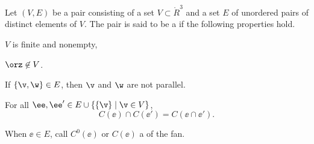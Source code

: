 \begin{definition}  
Let $(V,E)$ be a pair consisting of a set $V\subset \ring{R}^3$ and
a set $E$ of unordered pairs of distinct elements of $V$.  The pair
is said to be a  if the following properties hold.
\begin{description}
\item {} $V$ is finite and  nonempty,
\item {} $\orz\not\in V$.
\item {} If $\{\v,\w\} \in E$, then $\v$ and $\w$
are not parallel.
\item {}
For all $\ee ,\ee '\in E \cup \{\{\v\}\mid \v\in V\}$, 
\begin{displaymath}C(\ee )\cap C(\ee ') = C(\ee \cap \ee
').\end{displaymath}
\end{description}
When $\ee\in E$, call $C^0(\ee)$ or $C(\ee)$ a 
of the fan.
\end{definition}
%
%
%
%
%
%
\bigskip\hbox{~}\bigskip


